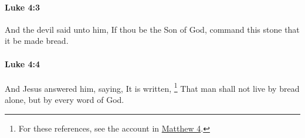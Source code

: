 		\paragraph{Luke 4:3} %
			\label{LUKE-4-3}

			And the devil said unto him, If thou be the Son of God, command this stone that it be made bread.

			\begin{framed}
			\scriptsize
				\begin{compactdesc}
					\item[SBLG] 
				\end{compactdesc}
			\end{framed}

		\paragraph{Luke 4:4} %
			\label{LUKE-4-4}

			And Jesus answered him, saying, It is written,%
				\footnote{%
					For these references, see the account in \hyperref[MATTHEW-4]{Matthew 4}.
					} 
			That man shall not live by bread alone, but by every word of God.

